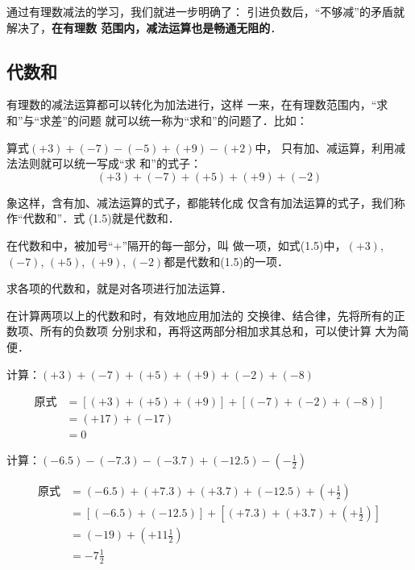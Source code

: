 通过有理数减法的学习，我们就进一步明确了：
引进负数后，“不够减”的矛盾就解决了，\textbf{在有理数
	范围内，减法运算也是畅通无阻的}．


\subsection{代数和}
有理数的减法运算都可以转化为加法进行，这样
一来，在有理数范围内，“求和”与“求差”的问题
就可以统一称为“求和”的问题了．比如：

算式$(+ 3)+(-7)-(-5)+(+9)-(+2)$中，
只有加、减运算，利用减法法则就可以统一写成“求
和”的式子：
\begin{equation}
(+ 3)+(-7)+(+5)+(+9)+(-2)
\end{equation}

象这样，含有加、减法运算的式子，都能转化成
仅含有加法运算的式子，我们称作“代数和”．式
(1.5)就是代数和．

在代数和中，被加号“+”隔开的每一部分，叫
做一项，如式(1.5)中，$(+3)$, $(-7)$, $(+ 5)$,
$(+9)$, $(-2)$都是代数和(1.5)的一项．

求各项的代数和，就是对各项进行加法运算．

在计算两项以上的代数和时，有效地应用加法的
交换律、结合律，先将所有的正数项、所有的负数项
分别求和，再将这两部分相加求其总和，可以使计算
大为简便．

\begin{example}
	计算：$(+3)+(-7)+(+5)+(+9)+(-2)+(-8)$
\end{example}

\begin{solution}
	\begin{align*}
	\text{原式}&= [(+3)+(+5)+(+9)]+[(-7)+(-2)+(-8)] \tag{交换、结合律}\\
	&=(+17)+(-17) \tag{同号加法法则}\\
	&=0 \tag{相反数的特性}
	\end{align*}
\end{solution}

\begin{example}
	计算：$(-6.5)-(-7.3)-(-3.7)+(-12.5)-\left(-\frac{1}{2}\right)$
\end{example}

\begin{solution}
	\begin{align*}
	\text{原式}&= (-6.5)+(+7.3)+(+3.7)+(-12.5)+\left(+\frac{1}{2}\right) \tag{减法法则}\\
	&=[(-6.5)+(-12.5)]+\left[(+7.3)+(+3.7)+\left(+\frac{1}{2}\right)\right] \tag{交换、结合律}\\
	&=(-19)+\left(+11\frac{1}{2}\right) \tag{同号相加法则}\\
	&=-7\frac{1}{2} \tag{异号相加法则}
	\end{align*}
\end{solution}

